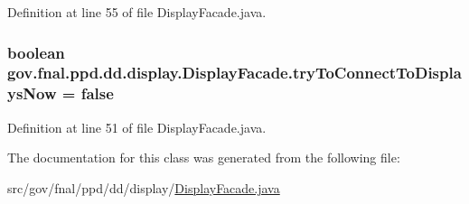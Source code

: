 Definition at line 55 of file Display\-Facade.\-java.

\hypertarget{classgov_1_1fnal_1_1ppd_1_1dd_1_1display_1_1DisplayFacade_a0e46150fb1f40a87bac5060ea85c6dcc}{
\subsubsection[{try\-To\-Connect\-To\-Displays\-Now}]{\setlength{\rightskip}{0pt plus 5cm}boolean gov.\-fnal.\-ppd.\-dd.\-display.\-Display\-Facade.\-try\-To\-Connect\-To\-Displays\-Now = false\hspace{0.3cm}{\ttfamily [static]}}}\label{classgov_1_1fnal_1_1ppd_1_1dd_1_1display_1_1DisplayFacade_a0e46150fb1f40a87bac5060ea85c6dcc}


Definition at line 51 of file Display\-Facade.\-java.



The documentation for this class was generated from the following file\-:\begin{DoxyCompactItemize}
\item 
src/gov/fnal/ppd/dd/display/\hyperlink{DisplayFacade_8java}{Display\-Facade.\-java}\end{DoxyCompactItemize}
